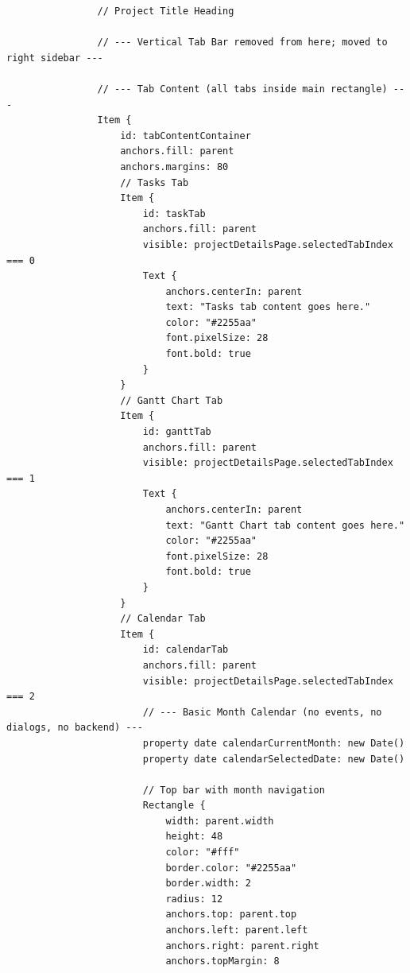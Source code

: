 \documentclass{report}
\begin{document}
\begin{lstlisting}
                // Project Title Heading

                // --- Vertical Tab Bar removed from here; moved to right sidebar ---

                // --- Tab Content (all tabs inside main rectangle) ---
                Item {
                    id: tabContentContainer
                    anchors.fill: parent
                    anchors.margins: 80
                    // Tasks Tab
                    Item {
                        id: taskTab
                        anchors.fill: parent
                        visible: projectDetailsPage.selectedTabIndex === 0
                        Text {
                            anchors.centerIn: parent
                            text: "Tasks tab content goes here."
                            color: "#2255aa"
                            font.pixelSize: 28
                            font.bold: true
                        }
                    }
                    // Gantt Chart Tab
                    Item {
                        id: ganttTab
                        anchors.fill: parent
                        visible: projectDetailsPage.selectedTabIndex === 1
                        Text {
                            anchors.centerIn: parent
                            text: "Gantt Chart tab content goes here."
                            color: "#2255aa"
                            font.pixelSize: 28
                            font.bold: true
                        }
                    }
                    // Calendar Tab
                    Item {
                        id: calendarTab
                        anchors.fill: parent
                        visible: projectDetailsPage.selectedTabIndex === 2
                        // --- Basic Month Calendar (no events, no dialogs, no backend) ---
                        property date calendarCurrentMonth: new Date()
                        property date calendarSelectedDate: new Date()

                        // Top bar with month navigation
                        Rectangle {
                            width: parent.width
                            height: 48
                            color: "#fff"
                            border.color: "#2255aa"
                            border.width: 2
                            radius: 12
                            anchors.top: parent.top
                            anchors.left: parent.left
                            anchors.right: parent.right
                            anchors.topMargin: 8


\end{lstlisting}
\end{document}
